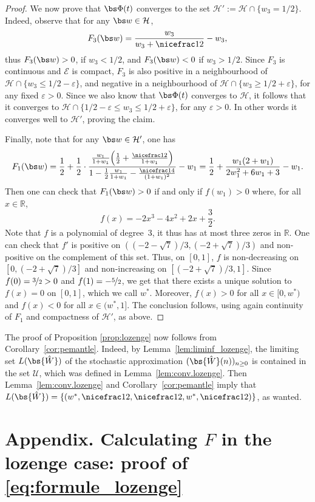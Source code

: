 \begin{proof}
We now prove that $\bs \Phi(t)$ converges to the set $\mathcal H':=\mathcal H \cap \{w_3=1/2\}$.
Indeed, observe that for any $\bs w\in \mathcal H$,
\[
F_3(\bs w) = \frac{w_3}{w_3+\nicefrac12} - w_3,
\]
thus $F_3(\bs w) >0$, if $w_3<1/2$, and $F_3(\bs w)<0$ if $w_3>1/2$.
Since $F_3$ is continuous and $\mathcal E$ is compact, $F_3$ is also positive in a neighbourhood of $\mathcal H \cap \{w_3\le 1/2 - \varepsilon\}$,
and negative in a neighbourhood of $\mathcal H \cap \{w_3\ge 1/2 + \varepsilon\}$, for any fixed $\varepsilon >0$.
Since we also know that $\bs \Phi(t)$ converges to $\mathcal H$, it follows that it converges to
$\mathcal H \cap \{1/2-\varepsilon \le w_3\le 1/2+\varepsilon\}$, for any $\varepsilon>0$. In other words
it converges well to $\mathcal H'$, proving the claim.

Finally, note that for any $\bs w\in \mathcal H'$, one has
\[
F_1(\bs w) =
\frac12+\frac12\cdot\frac{\frac{w_1}{1+w_1}\Bigl(\frac12+\frac{\nicefrac12}{1+w_1}\Bigr)}
{1-\frac12\frac{w_1}{1+w_1}-\frac{\nicefrac14}{(1+w_1)^2}}-w_1
=\frac12+\frac{w_1(2+w_1)}{2w_1^2+6w_1+3}-w_1.
\]
Then one can check that $F_1(\bs w)>0$ if and only if
$f(w_1) >0$ where, for all $x\in \mathbb R$,
\[
f(x)= -2x^3-4x^2+2x+\frac32.
\]
Note that $f$ is a polynomial of degree~3, it thus has at most three zeros in $\mathbb R$.
One can check that $f'$ is positive on $((-2-\sqrt{7})/3,(-2+\sqrt{7})/3)$ and non-positive on the complement of this set. Thus, on $[0,1]$, $f$ is non-decreasing on $[0, (-2+\sqrt{7})/3]$ and non-increasing on $[(-2+\sqrt{7})/3, 1]$. Since $f(0)= \nicefrac32>0$ and $f(1)=-\nicefrac52$, we get that there exists a unique solution to $f(x) = 0$ on $[0,1]$, which we call $w^*$.
Moreover, $f(x)>0$ for all $x\in [0, w^*)$ and $f(x)<0$ for all $x\in (w^*, 1]$. The conclusion follows, using again continuity of $F_1$ and compactness of $\mathcal H'$, as above.
\end{proof}

The proof of Proposition \ref{prop:lozenge} now follows from Corollary~\ref{cor:pemantle}. Indeed, by Lemma~\ref{lem:liminf_lozenge},
the limiting set $L(\bs {\hat W})$ of the stochastic approximation $(\bs {\hat W}(n))_{n\ge 0}$ is contained in the set $\mathcal U$, which was defined in Lemma~\ref{lem:conv.lozenge}.
Then Lemma~\ref{lem:conv.lozenge} and Corollary~\ref{cor:pemantle} imply that $L(\bs {\hat W})= \{(w^*, \nicefrac12, \nicefrac12, w^*, \nicefrac12)\}$, as wanted.

\appendix
\section*{Appendix. Calculating \texorpdfstring{$F$}{F} in the lozenge case: proof of \texorpdfstring{\eqref{eq:formule_lozenge}}{eqref}}
\label{sec:app}

